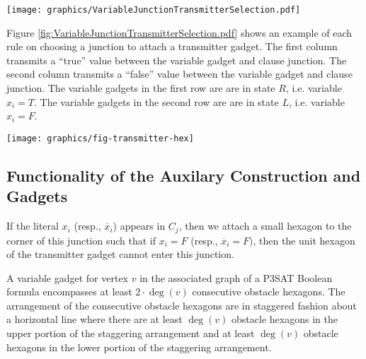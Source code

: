 \documentclass[10pt]{CSUNthesis}
\theoremstyle{plain}%
\theoremstyle{definition}
\theoremstyle{remark}
\begin{document}
\begin{minipage}{\linewidth}
\begin{center}
\texttt{[image: graphics/VariableJunctionTransmitterSelection.pdf]}
\label{fig:VariableJunctionTransmitterSelection.pdf}
\end{center}
\end{minipage} 

Figure \ref{fig:VariableJunctionTransmitterSelection.pdf} shows an example of each rule on choosing a junction to attach a transmitter gadget.
The first column transmits a ``true'' value between the variable gadget and clause junction.
The second column transmits a ``false'' value between the variable gadget and clause junction.
The variable gadgets in the first row are are in state $R$, i.e. variable $x_i = T$.
The variable gadgets in the second row are are in state $L$, i.e. variable $x_i = F$.

\begin{minipage}{\linewidth}
\begin{center}
	\texttt{[image: graphics/fig-transmitter-hex]}
	\label{fig:transmitter}
\end{center}
\end{minipage} 

\subsection{Functionality of the Auxilary Construction and Gadgets}

If the literal $x_i$ (resp., $\overline{x}_i$) appears in $C_j$, then we attach a small hexagon to the corner of this junction such that if $x_i=F$ (resp., $\overline{x}_i=F)$, then the unit hexagon of the transmitter gadget cannot enter this junction. 

A variable gadget for vertex $v$ in the associated graph of a P3SAT Boolean formula encompasses at least $2 \cdot \deg (v)$ consecutive obstacle hexagons. 
The arrangement of the consecutive obstacle hexagons are in staggered fashion about a horizontal line where there are at least $\deg (v)$ obstacle hexagons in the upper portion of the staggering arrangement and at least $\deg (v)$ obstacle hexagons in the lower portion of the staggering arrangement.
\end{document}
